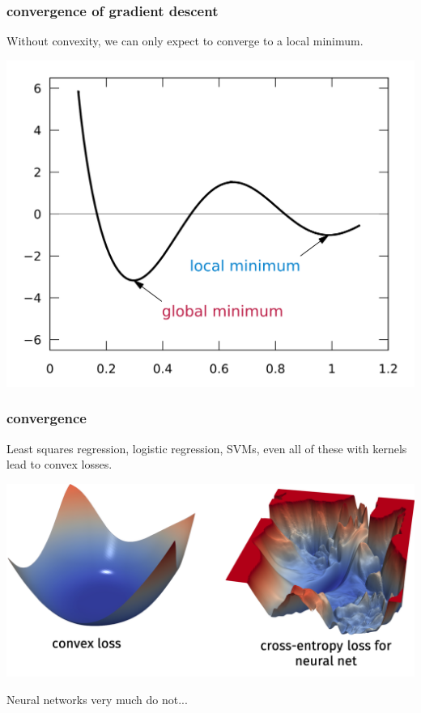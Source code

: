 \documentclass[handout,compress]{beamer}
\begin{document}
\begin{frame}[t]
	\frametitle{convergence of gradient descent}
	\begin{center}
		Without convexity, we can only expect to converge to a local minimum.
		
		\includegraphics[width=.7\textwidth]{local_min.png}
	\end{center}
\end{frame}


\begin{frame}
	\frametitle{convergence}
	Least squares regression, logistic regression, SVMs, even all of these with kernels lead to convex losses.
	\begin{center}
		\includegraphics[width=.8\textwidth]{nonconvex.png}
	\end{center}

Neural networks very much do not...
	
\end{frame}
\end{document}
